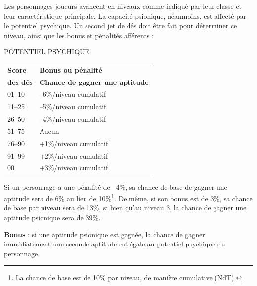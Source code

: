 \documentclass[11pt]{article}
\begin{document}
{\bigskip

Les personnages-joueurs avancent en niveaux comme indiqué par leur classe et leur caractéristique principale. La capacité psionique, néanmoins, est affecté par le potentiel psychique. Un second jet de dés doit être fait pour déterminer ce niveau, ainsi que les bonus et pénalités afférents :

\bigskip

{\parindent3cm POTENTIEL PSYCHIQUE

\bigskip

\begin{tabular}{p{3cm}l}
\textbf{Score} & \textbf{Bonus ou pénalité} \\
\textbf{des dés} & \textbf{Chance de gagner une aptitude} \\
01--10 & --6\%/niveau cumulatif \\
11--25 & --5\%/niveau cumulatif \\
26--50 & --4\%/niveau cumulatif \\
51--75 & Aucun \\
76--90 & +1\%/niveau cumulatif \\
91--99 & +2\%/niveau cumulatif \\
\hspace{0.4cm}00 & +3\%/niveau cumulatif \\
\end{tabular}}

\bigskip

Si un personnage a une pénalité de --4\%, sa chance de base de gagner une aptitude sera de 6\% au lieu de 10\%\footnote{La chance de base est de 10\% par niveau, de manière cumulative (NdT).}. De même, si son bonus est de 3\%, sa chance de base par niveau sera de 13\%, si bien qu'au niveau 3, la chance de gagner une aptitude psionique sera de 39\%.

\bigskip

\textbf{Bonus} : si une aptitude psionique est gagnée, la chance de gagner immédiatement une seconde aptitude est égale au potentiel psychique du personnage.

}
\end{document}
